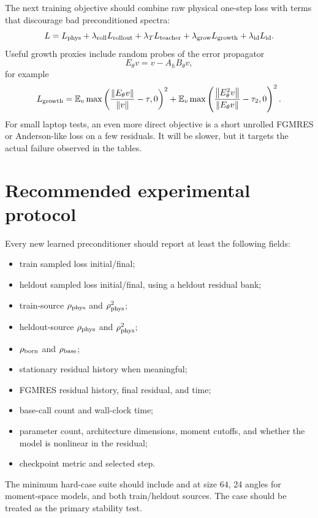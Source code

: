 \documentclass[11pt]{article}
\newcommand{\code}[1]{\texttt{\detokenize{#1}}}
\newcommand{\norm}[1]{\left\lVert #1 \right\rVert}
\newcommand{\Ah}{A_h}
\begin{document}
The next training objective should combine raw physical one-step loss with
terms that discourage bad preconditioned spectra:
\begin{equation}
  L
  =
  L_{\rm phys}
  +
  \lambda_{\rm roll}L_{\rm rollout}
  +
  \lambda_TL_{\rm teacher}
  +
  \lambda_{\rm grow}L_{\rm growth}
  +
  \lambda_{\rm id}L_{\rm id}.
\end{equation}
Useful growth proxies include random probes of the error propagator
\[
  E_\theta v = v-\Ah B_\theta v,
\]
for example
\[
  L_{\rm growth}
  =
  \mathbb{E}_v\max\left(
  \frac{\norm{E_\theta v}}{\norm v}-\tau,0
  \right)^2
  +
  \mathbb{E}_v\max\left(
  \frac{\norm{E_\theta^2 v}}{\norm{E_\theta v}}-\tau_2,0
  \right)^2 .
\]
For small laptop tests, an even more direct objective is a short unrolled
FGMRES or Anderson-like loss on a few residuals.  It will be slower, but it
targets the actual failure observed in the tables.

\section{Recommended experimental protocol}

Every new learned preconditioner should report at least the following fields:
\begin{itemize}
  \item train sampled loss initial/final;
  \item heldout sampled loss initial/final, using a heldout residual bank;
  \item train-source \(\rho_{\rm phys}\) and \(\rho_{\rm phys}^2\);
  \item heldout-source \(\rho_{\rm phys}\) and \(\rho_{\rm phys}^2\);
  \item \(\rho_{\rm born}\) and \(\rho_{\rm base}\);
  \item stationary residual history when meaningful;
  \item FGMRES residual history, final residual, and time;
  \item base-call count and wall-clock time;
  \item parameter count, architecture dimensions, moment cutoffs, and whether
  the model is nonlinear in the residual;
  \item checkpoint metric and selected step.
\end{itemize}

The minimum hard-case suite should include \code{anisotropic} and
\code{mixed} at size \(64\), 24 angles for moment-space models, and both
train/heldout sources.  The \code{mixed} case should be treated as the primary
stability test.
\end{document}
